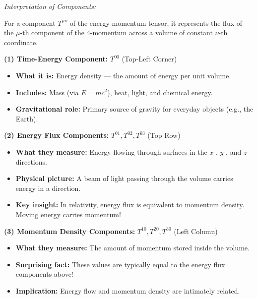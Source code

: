\begin{foundation}
  \noindent\textit{Interpretation of Components:}
  
  For a component $T^{\mu\nu}$ of the energy-momentum tensor, it represents the flux of the $\mu$-th component of the 4-momentum across a volume of constant $\nu$-th coordinate.

  \bigskip\noindent
  \textbf{(1) Time-Energy Component: } $T^{00}$ (Top-Left Corner)
  \begin{itemize}
    \item \textbf{What it is:} Energy density --- the amount of energy per unit volume.
    \medskip
    \item \textbf{Includes:} Mass (via $E = mc^2$), heat, light, and chemical energy.
    \medskip
    \item \textbf{Gravitational role:} Primary source of gravity for everyday objects (e.g., the Earth).
  \end{itemize}

  \bigskip\noindent
  \textbf{(2) Energy Flux Components: } $T^{01}, T^{02}, T^{03}$ (Top Row)
  \begin{itemize}
    \item \textbf{What they measure:} Energy flowing through surfaces in the $x$-, $y$-, and $z$-directions.
    \medskip
    \item \textbf{Physical picture:} A beam of light passing through the volume carries energy in a direction.
    \medskip
    \item \textbf{Key insight:} In relativity, energy flux is equivalent to momentum density. Moving energy carries momentum!
  \end{itemize}

  \bigskip\noindent
  \textbf{(3) Momentum Density Components: } $T^{10}, T^{20}, T^{30}$ (Left Column)
  \begin{itemize}
    \item \textbf{What they measure:} The amount of momentum stored inside the volume.
    \medskip
    \item \textbf{Surprising fact:} These values are typically equal to the energy flux components above!
    \medskip
    \item \textbf{Implication:} Energy flow and momentum density are intimately related.
  \end{itemize}


\end{foundation}

